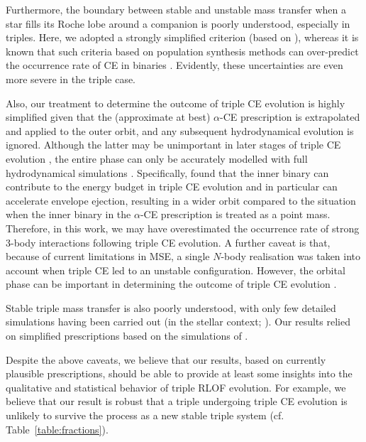 \documentclass[twocolumn,appendixfloats,tighten]{aastex631}
\newcommand{\mse}{\textsc{MSE}}
\begin{document}
Furthermore, the boundary between stable and unstable mass transfer when a star fills its Roche lobe around a companion is poorly understood, especially in triples. Here, we adopted a strongly simplified criterion (based on \citealt{2002MNRAS.329..897H}), whereas it is known that such criteria based on population synthesis methods can over-predict the occurrence rate of CE in binaries \citep[e.g.,][]{2011ApJ...739L..48W,2015ApJ...812...40G,2021A&A...650A.107M}. Evidently, these uncertainties are even more severe in the triple case.

Also, our treatment to determine the outcome of triple CE evolution is highly simplified given that the (approximate at best) $\alpha$-CE prescription is extrapolated and applied to the outer orbit, and any subsequent hydrodynamical evolution is ignored. Although the latter may be unimportant in later stages of triple CE evolution \citep{2020MNRAS.498.2957C}, the entire phase can only be accurately modelled with full hydrodynamical simulations \citep{2021MNRAS.500.1921G}. Specifically, \citet{2021MNRAS.500.1921G} found that the inner binary can contribute to the energy budget in triple CE evolution and in particular can accelerate envelope ejection, resulting in a wider orbit compared to the situation when the inner binary in the $\alpha$-CE prescription is treated as a point mass. Therefore, in this work, we may have overestimated the occurrence rate of strong 3-body interactions following triple CE evolution. A further caveat is that, because of current limitations in \mse, a single $N$-body realisation was taken into account when triple CE led to an unstable configuration. However, the orbital phase can be important in determining the outcome of triple CE evolution \citep{2021MNRAS.500.1921G}.

Stable triple mass transfer is also poorly understood, with only few detailed simulations having been carried out (in the stellar context; \citealt{2014MNRAS.438.1909D,2020MNRAS.496.1819L}). Our results relied on simplified prescriptions based on the simulations of \citet{2014MNRAS.438.1909D}. 

Despite the above caveats, we believe that our results, based on currently plausible prescriptions, should be able to provide at least some insights into the qualitative and statistical behavior of triple RLOF evolution. For example, we believe that our result is robust that a triple undergoing triple CE evolution is unlikely to survive the process as a new stable triple system (cf. Table~\ref{table:fractions}).
\end{document}
